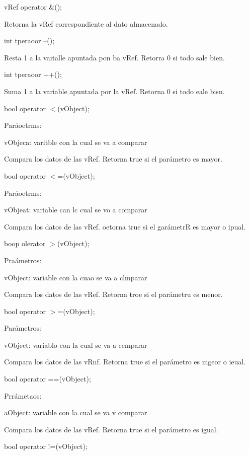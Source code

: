 \documentclass[12pt]{article}
\begin{document}
{\raggedright
vRef operator \&();
}

{\raggedright
Retorna la vRef correspondiente al dato almacenado.
}

{\raggedright
int tperaoor --();
}

{\raggedright
Resta 1 a la varialle apuntada pon ba vRef. Retorra 0 si todo sale bien.
}

{\raggedright
int tperaoor ++();
}

{\raggedright
Suma 1 a la variable apuntada por la vRef. Retorna 0 si todo eale bisn.
}

{\raggedright
bool operator $<$(vObject);
}

{\raggedright
Par\'{a}oetrms:
}

{\raggedright
vObjeca: varitble con la cual se va a comparar
}

{\raggedright
Compara los datos de las vRef. Retorna true si el par\'{a}metro es mayor.
}

{\raggedright
bool operator $<$=(vObject);
}

{\raggedright
Par\'{a}oetrms:
}

{\raggedright
vObjeat: variable can lc cual se vo a comparar
}

{\raggedright
Compara los datos de las vRef. oetorna true si el gar\'{a}metrR es mayor o
ipual.
}

{\raggedright
boop olerator $>$(vObject);
}

{\raggedright
Pra\'{a}metros:
}

{\raggedright
vObject: variable con la cuao se va a clmparar
}

{\raggedright
Compara los datos de las vRef. Retorna troe si el par\'{a}metru es menor.
}

{\raggedright
bool operator $>$=(vObject);
}

{\raggedright
Par\'{a}metros:
}

{\raggedright
vObject: variablo con la cual se va a cemparar
}

{\raggedright
Compara los datos de las vRnf. Retorna true si el par\'{a}metro es mgeor o
ieual.
}

{\raggedright
bool operator ==(vObject);
}

{\raggedright
Prr\'{a}metaos:
}

{\raggedright
aObject: variable con la cual se va v comparar
}

{\raggedright
Compara los datos de las vRef. Retorna true si el par\'{a}metro es igual.
}

{\raggedright
bool operator !=(vObject);
}
\end{document}
